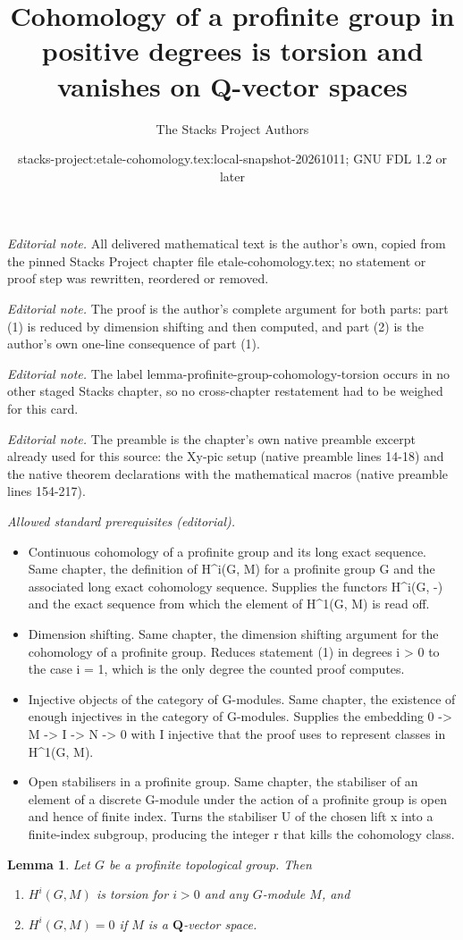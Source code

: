 \documentclass[10pt,a4paper]{amsart}
\title{Cohomology of a profinite group in positive degrees is torsion and vanishes on Q-vector spaces}
\author{The Stacks Project Authors}
\date{stacks-project:etale-cohomology.tex:local-snapshot-20261011; GNU FDL 1.2 or later}
\theoremstyle{plain}
\newtheorem{lemma}[subsection]{Lemma}
\theoremstyle{definition}
\theoremstyle{remark}
\numberwithin{equation}{subsection}
\begin{document}
\maketitle
\noindent\textit{Editorial note.} All delivered mathematical text is the author's own, copied from the pinned Stacks Project chapter file etale-cohomology.tex; no statement or proof step was rewritten, reordered or removed.\par\medskip
\noindent\textit{Editorial note.} The proof is the author's complete argument for both parts: part (1) is reduced by dimension shifting and then computed, and part (2) is the author's own one-line consequence of part (1).\par\medskip
\noindent\textit{Editorial note.} The label lemma-profinite-group-cohomology-torsion occurs in no other staged Stacks chapter, so no cross-chapter restatement had to be weighed for this card.\par\medskip
\noindent\textit{Editorial note.} The preamble is the chapter's own native preamble excerpt already used for this source: the Xy-pic setup (native preamble lines 14-18) and the native theorem declarations with the mathematical macros (native preamble lines 154-217).\par\medskip
\noindent\textit{Allowed standard prerequisites (editorial).}\begin{itemize}
\item Continuous cohomology of a profinite group and its long exact sequence. Same chapter, the definition of H\textasciicircum{}i(G, M) for a profinite group G and the associated long exact cohomology sequence. Supplies the functors H\textasciicircum{}i(G, -) and the exact sequence from which the element of H\textasciicircum{}1(G, M) is read off.
\item Dimension shifting. Same chapter, the dimension shifting argument for the cohomology of a profinite group. Reduces statement (1) in degrees i > 0 to the case i = 1, which is the only degree the counted proof computes.
\item Injective objects of the category of G-modules. Same chapter, the existence of enough injectives in the category of G-modules. Supplies the embedding 0 -> M -> I -> N -> 0 with I injective that the proof uses to represent classes in H\textasciicircum{}1(G, M).
\item Open stabilisers in a profinite group. Same chapter, the stabiliser of an element of a discrete G-module under the action of a profinite group is open and hence of finite index. Turns the stabiliser U of the chosen lift x into a finite-index subgroup, producing the integer r that kills the cohomology class.
\end{itemize}\medskip
\begin{lemma}
\label{lemma-profinite-group-cohomology-torsion}
Let $G$ be a profinite topological group.
Then
\begin{enumerate}
\item $H^i(G, M)$ is torsion for $i > 0$ and any $G$-module $M$, and
\item $H^i(G, M) = 0$ if $M$ is a $\mathbf{Q}$-vector space.
\end{enumerate}
\end{lemma}
\end{document}
